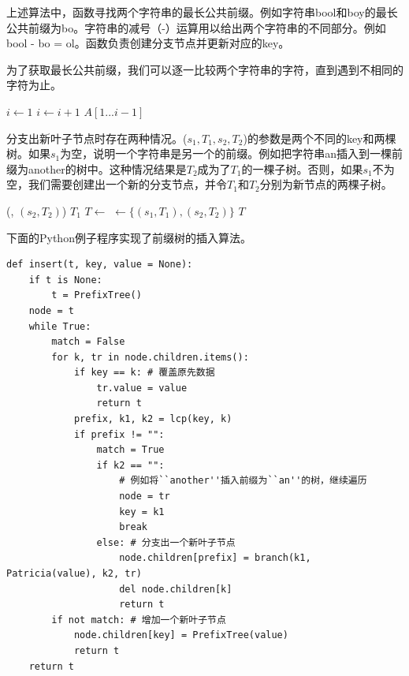 \documentclass[b5paper]{ctexart}
\begin{document}
上述算法中，函数寻找两个字符串的最长公共前缀。例如字符串bool和boy的最长公共前缀为bo。字符串的减号（-）运算用以给出两个字符串的不同部分。例如bool - bo = ol。函数负责创建分支节点并更新对应的key。

为了获取最长公共前缀，我们可以逐一比较两个字符串的字符，直到遇到不相同的字符为止。

\begin{algorithmic}[1]
  \State $i \gets 1 $
    \State $i \gets i + 1$
  \EndWhile
  \State \Return $A[1...i-1]$
\EndFunction
\end{algorithmic}

分支出新叶子节点时存在两种情况。($s_1, T_1, s_2, T_2$)的参数是两个不同的key和两棵树。如果$s_1$为空，说明一个字符串是另一个的前缀。例如把字符串an插入到一棵前缀为another的树中。这种情况结果是$T_2$成为了$T_1$的一棵子树。否则，如果$s_1$不为空，我们需要创建出一个新的分支节点，并令$T_1$和$T_2$分别为新节点的两棵子树。

\begin{algorithmic}[1]
    \State {}(, $(s_2, T_2)$)
    \State \Return $T_1$
  \EndIf
  \State $T \gets$ 
  \State {} $\gets \{(s_1, T_1), (s_2, T_2)\}$
  \State \Return $T$
\EndFunction
\end{algorithmic}

下面的Python例子程序实现了前缀树的插入算法。

\lstset{language=Python}
\begin{lstlisting}
def insert(t, key, value = None):
    if t is None:
        t = PrefixTree()
    node = t
    while True:
        match = False
        for k, tr in node.children.items():
            if key == k: # 覆盖原先数据
                tr.value = value
                return t
            prefix, k1, k2 = lcp(key, k)
            if prefix != "":
                match = True
                if k2 == "":
                    # 例如将``another''插入前缀为``an''的树，继续遍历
                    node = tr
                    key = k1
                    break
                else: # 分支出一个新叶子节点
                    node.children[prefix] = branch(k1, Patricia(value), k2, tr)
                    del node.children[k]
                    return t
        if not match: # 增加一个新叶子节点
            node.children[key] = PrefixTree(value)
            return t
    return t
\end{lstlisting}
\end{document}
